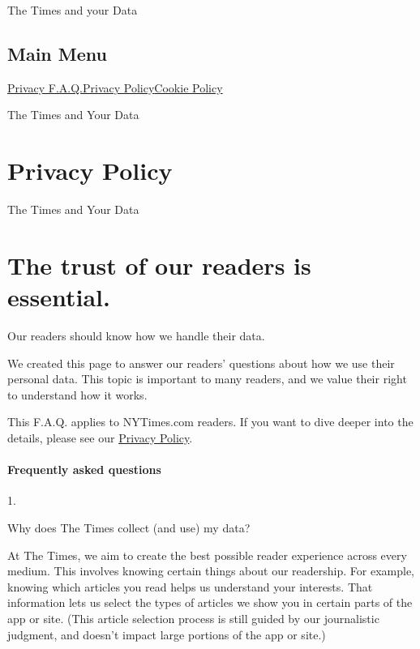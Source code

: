 The Times and your Data

\hypertarget{main-menu}{%
\subsection{Main Menu}\label{main-menu}}

\href{/privacy}{Privacy F.A.Q.}\href{/privacy/privacy-policy}{Privacy
Policy}\href{/privacy/cookie-policy}{Cookie Policy}

The Times and Your Data

\hypertarget{privacy-policy}{%
\section{Privacy Policy}\label{privacy-policy}}

The Times and Your Data

\hypertarget{the-trust-of-our-readers-is-essential}{%
\section{The trust of our readers is
essential.}\label{the-trust-of-our-readers-is-essential}}

Our readers should know how we handle their data.

We created this page to answer our readers' questions about how we use
their personal data. This topic is important to many readers, and we
value their right to understand how it works.

This F.A.Q. applies to NYTimes.com readers. If you want to dive deeper
into the details, please see our \href{/privacy/privacy-policy}{Privacy
Policy}.

\hypertarget{frequently-asked-questions}{%
\paragraph{Frequently asked
questions}\label{frequently-asked-questions}}

1.

Why does The Times collect (and use) my data?

At The Times, we aim to create the best possible reader experience
across every medium. This involves knowing certain things about our
readership. For example, knowing which articles you read helps us
understand your interests. That information lets us select the types of
articles we show you in certain parts of the app or site. (This article
selection process is still guided by our journalistic judgment, and
doesn't impact large portions of the app or site.)

